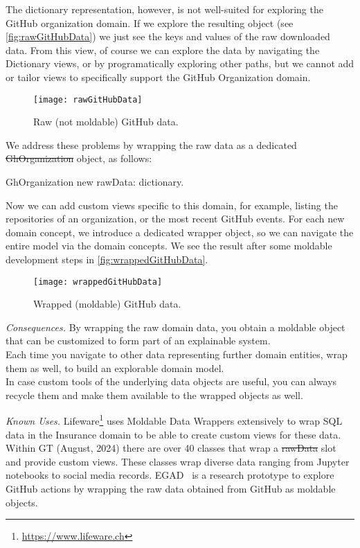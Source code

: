 \documentclass[acmsmall,screen,authorversion,nonacm]{acmart} %
\newcommand\eog[1]{\nbc{Edward}{#1}{purple}}
\newcommand{\patsec}[1]{\noindent\textit{#1.}\xspace}
\begin{document}

The dictionary representation, however, is not well-suited for exploring the GitHub organization domain.
If we explore the resulting object (see \autoref{fig:rawGitHubData}) we just see the keys and values of the raw downloaded data.
From this view, of course we can explore the data by navigating the Dictionary views, or by programatically exploring other paths, but we cannot add or tailor views to specifically support the GitHub Organization domain.

\begin{figure}[h]
  \texttt{[image: rawGitHubData]}
  \caption{Raw (not moldable) GitHub data.}
  \label{fig:rawGitHubData}
\end{figure}

We address these problems by wrapping the raw data as a dedicated \st{GhOrganization} object, as follows:
\begin{code}
GhOrganization new rawData: dictionary.
\end{code}

Now we can add custom views specific to this domain, for example, listing the repositories of an organization, or the most recent GitHub events.
For each new domain concept, we introduce a dedicated wrapper object, so we can navigate the entire model via the domain concepts.
We see the result after some moldable development steps in \autoref{fig:wrappedGitHubData}.
\begin{figure}[h]
  \texttt{[image: wrappedGitHubData]}
  \caption{Wrapped (moldable) GitHub data.}
  \label{fig:wrappedGitHubData}
\end{figure}

\patsec{Consequences}
By wrapping the raw domain data, you obtain a moldable object that can be customized to form part of an explainable system.\\
Each time you navigate to other data representing further domain entities, wrap them as well, to build an explorable domain model.\\
In case custom tools of the underlying data objects are useful, you can always recycle them and make them available to the wrapped objects as well.

\patsec{Known Uses}
Lifeware\footnote{\url{https://www.lifeware.ch}} uses Moldable Data Wrappers extensively to wrap SQL data in the Insurance domain to be able to create custom views for these data.
Within GT (August, 2024) there are over 40 classes that wrap a \st{rawData} slot and provide custom views.
These classes wrap diverse data ranging from Jupyter notebooks to social media records.
EGAD~\cite{Vale23a} is a research prototype to explore GitHub actions by wrapping the raw data obtained from GitHub as moldable objects.
\end{document}
